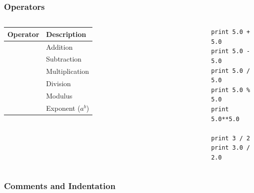 \documentclass{beamer}
\begin{document}
\begin{frame}[fragile]

    \frametitle{Operators}

    \begin{columns}[t]


 
        \begin{tabular}{l l}

            \bf Operator & \bf Description \\

            \midrule
            \code{+}  & Addition \\
            \code{-}  & Subtraction \\
            \code{*}  & Multiplication \\
            \code{/}  & Division \\
            \code{\%} & Modulus \\
            \code{**} & Exponent ($a^b$) \\
            \midrule

        \end{tabular}



\begin{lstlisting}
print 5.0 + 5.0
print 5.0 - 5.0
print 5.0 / 5.0
print 5.0 % 5.0
print 5.0**5.0

print 3 / 2
print 3.0 / 2.0

\end{lstlisting}

    \end{columns}

\end{frame}



\begin{frame}[fragile]

    \frametitle{Comments and Indentation}

    \begin{columns}[t]






    \end{columns}

\end{frame}
\end{document}
